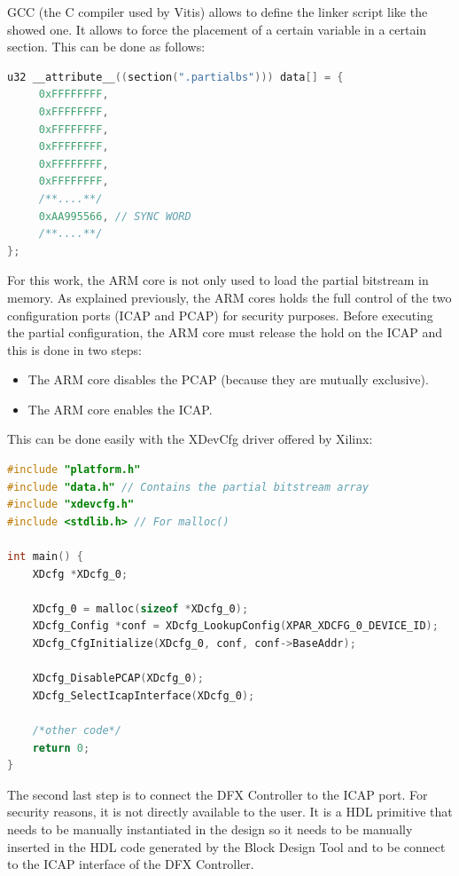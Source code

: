 GCC (the C compiler used by Vitis) allows to define the linker script like the showed one. It allows to force the placement of a certain variable in a certain section. This can be done as follows:

\begin{lstlisting}[language=C]
u32 __attribute__((section(".partialbs"))) data[] = {
	 0xFFFFFFFF,
	 0xFFFFFFFF,
	 0xFFFFFFFF,
	 0xFFFFFFFF,
	 0xFFFFFFFF,
	 0xFFFFFFFF,
     /**....**/
     0xAA995566, // SYNC WORD
     /**....**/
};
\end{lstlisting}

For this work, the ARM core is not only used to load the partial bitstream in memory. As explained previously, the ARM cores holds the full control of the two configuration ports (ICAP and PCAP) for security purposes. Before executing the partial configuration, the ARM core must release the hold on the ICAP and this is done in two steps:
\begin{itemize}
    \item The ARM core disables the PCAP (because they are mutually exclusive).
    \item The ARM core enables the ICAP.
\end{itemize}

This can be done easily with the XDevCfg driver offered by Xilinx:

\begin{lstlisting}[language=C]
#include "platform.h"
#include "data.h" // Contains the partial bitstream array
#include "xdevcfg.h"
#include <stdlib.h> // For malloc()

int main() {
	XDcfg *XDcfg_0;

	XDcfg_0 = malloc(sizeof *XDcfg_0);
	XDcfg_Config *conf = XDcfg_LookupConfig(XPAR_XDCFG_0_DEVICE_ID);
	XDcfg_CfgInitialize(XDcfg_0, conf, conf->BaseAddr);

	XDcfg_DisablePCAP(XDcfg_0);
	XDcfg_SelectIcapInterface(XDcfg_0);

    /*other code*/
    return 0;
}

\end{lstlisting}


The second last step is to connect the DFX Controller to the ICAP port. For security reasons, it is not directly available to the user. It is a HDL primitive that needs to be manually instantiated in the design so it needs to be manually inserted in the HDL code generated by the Block Design Tool and to be connect to the ICAP interface of the DFX Controller.

